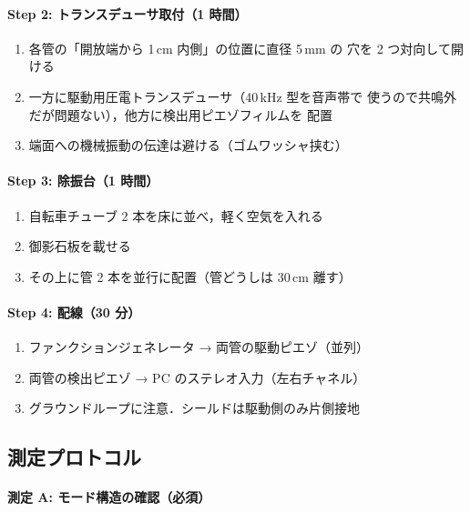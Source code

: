 \documentclass[11pt,a4paper]{article}
\begin{document}
\paragraph{Step 2: トランスデューサ取付（1 時間）}

\begin{enumerate}
\item 各管の「開放端から 1\,cm 内側」の位置に直径 5\,mm の
穴を 2 つ対向して開ける
\item 一方に駆動用圧電トランスデューサ（40\,kHz 型を音声帯で
使うので共鳴外だが問題ない），他方に検出用ピエゾフィルムを
配置
\item 端面への機械振動の伝達は避ける（ゴムワッシャ挟む）
\end{enumerate}

\paragraph{Step 3: 除振台（1 時間）}

\begin{enumerate}
\item 自転車チューブ 2 本を床に並べ，軽く空気を入れる
\item 御影石板を載せる
\item その上に管 2 本を並行に配置（管どうしは 30\,cm 離す）
\end{enumerate}

\paragraph{Step 4: 配線（30 分）}

\begin{enumerate}
\item ファンクションジェネレータ → 両管の駆動ピエゾ（並列）
\item 両管の検出ピエゾ → PC のステレオ入力（左右チャネル）
\item グラウンドループに注意．シールドは駆動側のみ片側接地
\end{enumerate}

\subsection{測定プロトコル}

\paragraph{測定 A: モード構造の確認（必須）}
\end{document}
